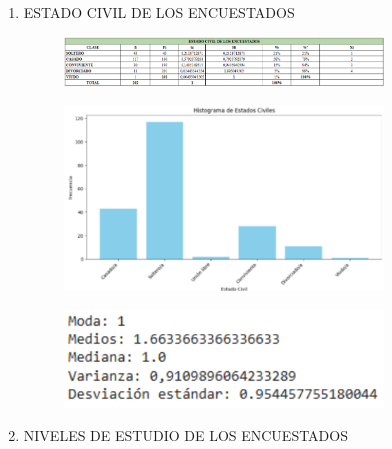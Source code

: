 \documentclass[12pt, a4paper]{article}
\begin{document}
\begin{enumerate}
\begin{enumerate}
\begin{figure}[H]
\begin{center}
            \end{center}
            \label{fig:PerfilBiologico}
        \end{figure}
        \item ESTADO CIVIL DE LOS ENCUESTADOS
        \begin{figure}[H]
            \begin{center}
                \includegraphics[width=0.80\textwidth]{images/EstadoCivil.png}
            \end{center}
            \label{fig:EstadoCivil}
        \end{figure}
        \begin{figure}[H]
            \begin{center}
                \includegraphics[width=0.80\textwidth]{images/histogramaEstadoCivil.png}
            \end{center}
            \label{fig:histogramaEstadoCivil}
        \end{figure}
        \begin{figure}[H]
            \begin{center}
                \includegraphics[width=0.80\textwidth]{images/EstadisticosEC.png}
            \end{center}
            \label{fig:EstadisticosEC}
        \end{figure}
        \item NIVELES DE ESTUDIO DE LOS ENCUESTADOS

\end{enumerate}
\end{enumerate}
\end{document}

